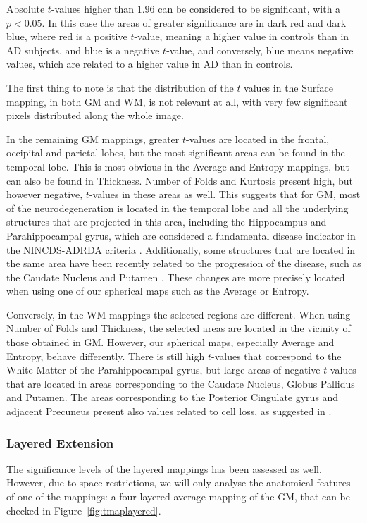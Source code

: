 Absolute $t$-values higher than $1.96$ can be considered to be significant, with a $p<0.05$. In this case the areas of greater significance are in dark red and dark blue, where red is a positive $t$-value, meaning a higher value in controls than in AD subjects, and blue is a negative $t$-value, and conversely, blue means negative values, which are related to a higher value in AD than in controls. 

The first thing to note is that the distribution of the $t$ values in the Surface mapping, in both \ac{GM} and \ac{WM}, is not relevant at all, with very few significant pixels distributed along the whole image. 

In the remaining \ac{GM} mappings, greater $t$-values are located in the frontal, occipital and parietal lobes, but the most significant areas can be found in the temporal lobe. This is most obvious in the Average and Entropy mappings, but can also be found in Thickness. Number of Folds and Kurtosis present high, but however negative, $t$-values in these areas as well. This suggests that for \ac{GM}, most of the neurodegeneration is located in the temporal lobe and all the underlying structures that are projected in this area, including the Hippocampus and Parahippocampal gyrus, which are considered a fundamental disease indicator in the NINCDS-ADRDA criteria \cite{Dubois2007}. Additionally, some structures that are located in the same area have been recently related to the progression of the disease, such as the Caudate Nucleus and Putamen \cite{Pievani2013}. These changes are more precisely located when using one of our spherical maps such as the Average or Entropy.

Conversely, in the \ac{WM} mappings the selected regions are different. When using Number of Folds and Thickness, the selected areas are located in the vicinity of those obtained in \ac{GM}. However, our spherical maps, especially Average and Entropy, behave differently. There is still high $t$-values that correspond to the White Matter of the Parahippocampal gyrus, but large areas of negative $t$-values that are located in areas corresponding to the Caudate Nucleus, Globus Pallidus and Putamen. The areas corresponding to the Posterior Cingulate gyrus and adjacent Precuneus present also values related to cell loss, as suggested in \cite{Baron2001}.

\subsubsection{Layered Extension}\label{sec:layeredttest}
The significance levels of the layered mappings has been assessed as well. However, due to space restrictions, we will only analyse the anatomical features of one of the mappings: a four-layered average mapping of the \ac{GM}, that can be checked in Figure~\ref{fig:tmaplayered}.

